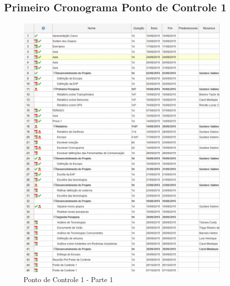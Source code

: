 \begin{apendicesenv}

\partapendices

\chapter[Cronograma]{Primeiro Cronograma Ponto de Controle 1}

\begin{figure}[h]
  \centering
  \includegraphics[width=400px, scale=1]{figuras/1cronograma}
  \caption{Ponto de Controle 1 - Parte 1}
\label{fig:1cronograma}
\end{figure}




\end{apendicesenv}
